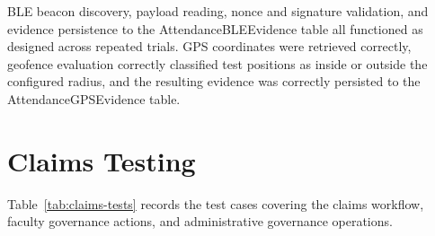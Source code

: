 \documentclass[12pt, a4paper, oneside]{report}
\begin{document}
BLE beacon discovery, payload reading, nonce and signature validation, and evidence persistence to the AttendanceBLEEvidence table all functioned as designed across repeated trials. GPS coordinates were retrieved correctly, geofence evaluation correctly classified test positions as inside or outside the configured radius, and the resulting evidence was correctly persisted to the AttendanceGPSEvidence table.

\section{Claims Testing}

Table~\ref{tab:claims-tests} records the test cases covering the claims workflow, faculty governance actions, and administrative governance operations.
\end{document}

